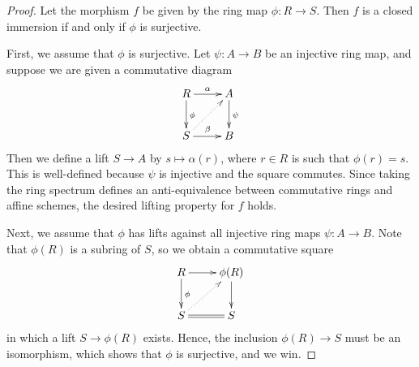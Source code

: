 \documentclass[10pt,a4paper]{amsart}
\theoremstyle{plain}
\theoremstyle{definition}
\theoremstyle{remark}
\numberwithin{equation}{subsection}
\begin{document}
\begin{proof}
Let the morphism $f$ be given by the ring map $\phi : R \to S$.
Then $f$ is a closed immersion if and only if $\phi$ is surjective.

\medskip\noindent
First, we assume that $\phi$ is surjective.
Let $\psi : A \to B$ be an injective ring map, and suppose we are given 
a commutative diagram
$$
\xymatrix{
R \ar[r]^\alpha \ar[d]^\phi & A \ar[d]^\psi \\
S \ar[r]^\beta \ar@{..>}[ur] & B
}
$$
Then we define a lift $S \to A$ by $s \mapsto \alpha(r)$, where 
$r \in R$ is such that $\phi(r) = s$. 
This is well-defined because $\psi$ is injective and the square commutes.
Since taking the ring spectrum defines an anti-equivalence between 
commutative rings and affine schemes, the desired lifting property for 
$f$ holds.

\medskip\noindent
Next, we assume that $\phi$ has lifts against all injective ring 
maps $\psi: A \to B$.
Note that $\phi(R)$ is a subring of $S$, so we obtain a commutative 
square
$$
\xymatrix{
R \ar[r] \ar[d]^\phi  & \phi(R) \ar[d] \\
S \ar@{=}[r] \ar@{..>}[ur] & S
}
$$
in which a lift $S \to \phi(R)$ exists. 
Hence, the inclusion $\phi(R) \to S$ must be an isomorphism, which 
shows that $\phi$ is surjective, and we win.
\end{proof}
\end{document}
